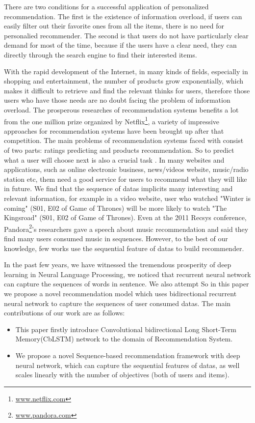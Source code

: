 \documentclass[runningheads]{llncs}
\begin{document}
There are two conditions for a successful application of personalized recommendation.
The first is the existence of information overload, if users can easily filter out their favorite ones from all the items, there is no need for personalied recommender. The second is that users do not have particularly clear demand for most of the time, because if the users have a clear need, they can directly through the search engine to find their interested items. 

With the rapid development of the Internet, in many kinds of fields, especially in shopping and entertainment, the number of products grow exponentially, which makes it difficult to retrieve and find the relevant thinks for users, therefore those users who have those needs are no doubt facing the problem of information overload. The prosperous researches of recommendation systems benefits a lot from the one million prize organized by Netflix\footnote{\url{www.netflix.com}}, a variety of impressive approaches for recommendation systems have been brought up after that competition. The main problems of recommendation systems faced with consist of two parts: ratings predicting and products recommendation. So to predict what a user will choose next is also a crucial task \cite{15}. In many websites and applications, such as online electronic business, news/videos website, music/radio station etc, them need a good service for users to recommend what they will like in future. We find that the sequence of datas implicits many interesting and relevant information, for example in a video website, user who watched "Winter is coming" (S01, E02 of Game of Thrones) will be more likely to watch "The Kingsroad" (S01, E02 of Game of Thrones). Even at the 2011 Recsys conference, Pandora\footnote{\url{www.pandora.com}}'s researchers gave a speech about music recommendation and said they find many users consumed music in sequences. However, to the best of our knowledge, few works use the sequential feature of datas to build recommender.

In the past few years, we have witnessed the tremendous prosperity of deep learning in Neural Language Processing, we noticed that recurrent neural network can capture the sequences of words in sentence. We also attempt  So in this paper we propose a novel recommendation model which uses bidirectional recurrent neural network to capture the sequences of user consumed datas. The main contributions of our work are as follows: 
 \begin{itemize}
\item This paper firstly introduce Convolutional bidirectional Long Short-Term Memory(CbLSTM) network to the domain of Recommendation System. 
\item We propose a novel Sequence-based recommendation framework with deep neural network, which can capture the sequential features of datas, as well scales linearly with the number of objectives (both of users and items).
 \end{itemize}
\end{document}
